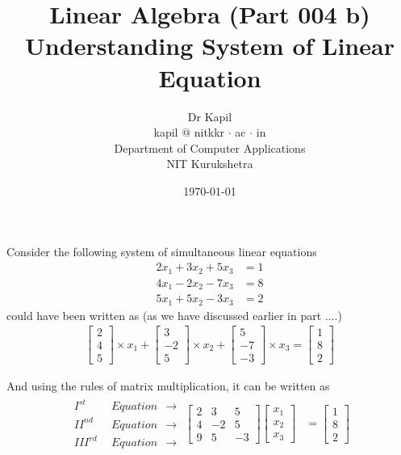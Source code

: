 \documentclass{article}
\title{Linear Algebra (Part 004 b)\\Understanding System of Linear Equation}
\author{Dr Kapil\\kapil $@$ nitkkr $\cdot$ ac $\cdot$ in\\Department of Computer Applications\\ NIT Kurukshetra}
\date{\today}
\begin{document}
    \maketitle
    \thispagestyle{fancy}
    Consider the following system of simultaneous linear equations
    \begin{align}
        2x_1 + 3x_2 + 5x_3 &= 1 \nonumber\\
        4x_1 - 2x_2 - 7x_3 &= 8 \nonumber\\
        5x_1 + 5x_2 - 3x_3 &= 2 \nonumber
    \end{align}
    could have been written as (as we have discussed earlier in part ....)
    \begin{align}
        \begin{bmatrix}
            2\\
            4\\
            5
        \end{bmatrix} \times x_1 +\begin{bmatrix}
            3\\
            -2\\
            5
        \end{bmatrix} \times x_2+\begin{bmatrix}
            5\\
            -7\\
            -3
        \end{bmatrix} \times x_3 =\begin{bmatrix}
            1\\
            8\\
            2
        \end{bmatrix} \label{a1}
    \end{align}

And using the rules of matrix multiplication, it can be written as
    \begin{align}
        \begin{matrix}
            I^{st}~~&Equation~~\longrightarrow\\
            II^{nd}~~&Equation~~\longrightarrow\\
            III^{rd}~~&Equation~~\longrightarrow
        \end{matrix}
                     \begin{bmatrix}
                        2 & 3 & 5\\
                        4 & -2 & 5\\
                        9 & 5 & -3
                   \end{bmatrix} \begin{bmatrix}
                                    x_1 \\ x_2 \\ x_3
                                 \end{bmatrix} &= \begin{bmatrix}
                                                    1 \\ 8 \\ 2
                                                  \end{bmatrix} \label{a2}
    \end{align}
    
\end{document}
